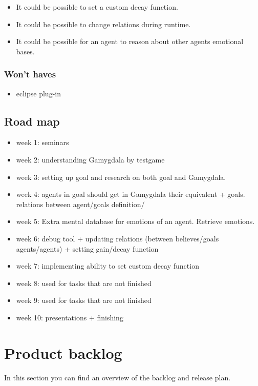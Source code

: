 \documentclass[]{article}
\begin{document}
\begin{itemize}
	\item It could be possible to set a custom decay function.
	\item It could be possible to change relations during runtime.
	
	\item It could be possible for an agent to reason about other agents emotional bases.
\end{itemize}

\subsubsection*{Won't haves}
\begin{itemize}
	\item eclipse plug-in
\end{itemize}

\subsection{Road map}
\begin{itemize}
	\item week 1: seminars
	\item week 2: understanding Gamygdala by testgame
	\item week 3: setting up goal and research on both goal and Gamygdala.
	\item week 4: agents in goal should get in Gamygdala their equivalent + goals. relations between agent/goals definition/
	\item week 5:  Extra mental database for emotions of an agent. Retrieve emotions.
	\item week 6: debug tool + updating relations (between believes/goals agents/agents) + setting gain/decay function
	\item week 7: implementing ability to set custom decay function
	\item week 8: used for tasks that are not finished
	\item week 9: used for tasks that are not finished
	\item week 10: presentations + finishing
	
\end{itemize}

\section{Product backlog}
In this section you can find an overview of the backlog and release plan.
\end{document}

